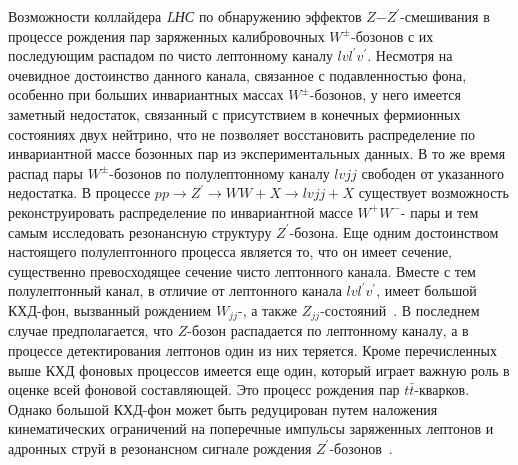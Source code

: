 Возможности коллайдера \textit{LНС} по обнаружению эффектов $Z$−$Z^\prime$-смешивания в процессе рождения пар заряженных калибровочных $W^±$-бозонов с их последующим распадом по чисто лептонному каналу $lvl^\prime v^\prime$. Несмотря на очевидное достоинство данного канала, связанное с подавленностью фона, особенно при больших инвариантных массах $W^±$-бозонов, у него имеется заметный недостаток, связанный с присутствием в конечных фермионных состояниях двух нейтрино, что не позволяет восстановить распределение по инвариантной массе бозонных пар из экспериментальных данных. В то же время распад пары $W^±$-бозонов по полулептонному каналу $lvjj$ свободен от указанного недостатка. В процессе $pp \rightarrow Z^\prime \rightarrow WW + X \rightarrow lvjj + X$ существует возможность реконструировать распределение по инвариантной массе $W^+W^-$- пары и тем самым исследовать резонансную структуру $Z^\prime$-бозона. Еще одним достоинством настоящего полулептонного процесса является то, что он имеет сечение, существенно превосходящее сечение чисто лептонного канала. Вместе с тем полулептонный канал, в отличие от лептонного канала $lvl^\prime v^\prime$, имеет большой КХД-фон, вызванный рождением $W_{jj}$-, а также $Z_{jj}$-состояний~\cite{ada-lvlv:2013}. В последнем случае предполагается, что $Z$-бозон распадается по лептонному каналу, а в процессе детектирования лептонов один из них теряется. Кроме перечисленных выше КХД фоновых процессов имеется еще один, который играет важную роль в оценке всей фоновой составляющей. Это процесс рождения пар $t\bar{t}$-кварков. Однако большой КХД-фон может быть редуцирован путем наложения кинематических ограничений на поперечные импульсы заряженных лептонов и адронных струй в резонансном сигнале рождения $Z^\prime$-бозонов~\cite{Bobovnikov:2016}.

